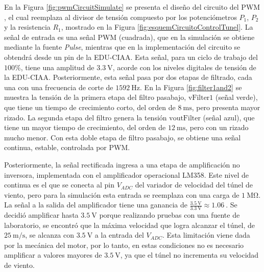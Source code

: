 En la Figura \ref{fig:pwmCircuitSimulate} se presenta el diseño del circuito del PWM \cite{EEVblog225}, el cual reemplaza al divisor de tensión compuesto por los potenciómetros $P_{1}$, $P_{2}$ y la resistencia $R_{1}$, mostrado en la Figura \ref{fig:esquemCircuitoControlTunel}. La señal de entrada es una señal PWM (cuadrada), que en la simulación se obtiene mediante la fuente \textit{Pulse}, mientras que en la implementación del circuito se obtendrá desde un pin de la EDU-CIAA. Esta señal, para un ciclo de trabajo del $100\%$, tiene una amplitud de $\SI{3.3}{\volt}$, acorde con los niveles digitales de tensión de la EDU-CIAA. Posteriormente, esta señal pasa por dos etapas de filtrado, cada una con una frecuencia de corte de $\SI{1592}{\hertz}$. En la Figura \ref{fig:filter1and2} se muestra la tensión de la primera etapa del filtro pasabajo, $\text{vFilter1}$ (señal verde), que tiene un tiempo de crecimiento corto, del orden de $\SI{8}{\milli\second}$, pero presenta mayor rizado. La segunda etapa del filtro genera la tensión $\text{voutFilter}$ (señal azul), que tiene un mayor tiempo de crecimiento, del orden de $\SI{12}{\milli\second}$, pero con un rizado mucho menor. Con esta doble etapa de filtro pasabajo, se obtiene una señal continua, estable, controlada por PWM.


Posteriormente, la señal rectificada ingresa a una etapa de amplificación no inversora, implementada con el amplificador operacional LM358. Este nivel de continua es el que se conecta al pin $V_{ADC}$ del variador de velocidad del túnel de viento, pero para la simulación esta entrada se reemplaza con una carga de $\SI{1}{\mega\ohm}$. La señal a la salida del amplificador tiene una ganancia de $\frac{\SI{3.5}{\volt}}{\SI{3.3}{\volt}} \approx \SI{1.06}{}$. Se decidió amplificar hasta $\SI{3.5}{\volt}$ porque realizando pruebas con una fuente de laboratorio, se encontró que la máxima velocidad que logra alcanzar el túnel, de $\SI{25}{\meter\per\second}$, se alcanza con $\SI{3.5}{\volt}$ a la entrada del $V_{ADC}$. Esta limitación viene dada por la mecánica del motor, por lo tanto, en estas condiciones no es necesario amplificar a valores mayores de $\SI{3.5}{\volt}$, ya que el túnel no incrementa su velocidad de viento.



